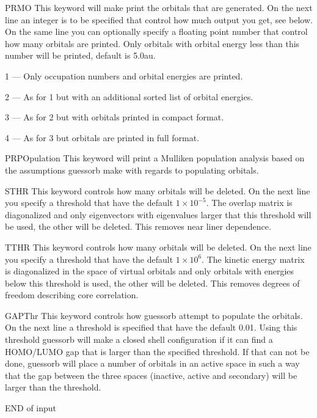 \begin{keywordlist}
\item[PRMO]
This keyword will make  print the orbitals that are
generated. On the next line an integer is to be specified that control
how much output you get, see below. On the same line you can optionally specify
a floating point number that control how many orbitals are printed.
Only orbitals with orbital energy less than this number will be printed,
default is 5.0au.
\begin{list}{}{}
\item 1 --- Only occupation numbers and orbital energies are printed.
\item 2 --- As for 1 but with an additional sorted list of orbital energies.
\item 3 --- As for 2 but with orbitals printed in compact format.
\item 4 --- As for 3 but orbitals are printed in full format.
\end{list}
\item[PRPOpulation]
This keyword will print a Mulliken population analysis based on the
assumptions guessorb make with regards to populating orbitals.
\item[STHR]
This keyword controls how many orbitals will be deleted.
On the next line you specify a threshold that have the default $1\times 10^{-5}$.
The overlap matrix is diagonalized and only eigenvectors
with eigenvalues larger that this threshold will be used,
the other will be deleted.
This removes near liner dependence.
\item[TTHR]
This keyword controls how many orbitals will be deleted.
On the next line you specify a threshold that have the default $1\times 10^6$.
The kinetic energy matrix is diagonalized in the space
of virtual orbitals and only orbitals with energies below
this threshold is used, the other will be deleted.
This removes degrees of freedom describing core correlation.
\item[GAPThr]
This keyword controls how guessorb attempt to populate
the orbitals.
On the next line a threshold is specified that have
the default 0.01.
Using this threshold guessorb will make a closed shell
configuration if it can find a HOMO/LUMO gap that is larger
than the specified threshold.
If that can not be done, guessorb will place a number of orbitals
in an active space in such a way that the gap between the
three spaces (inactive, active and secondary) will be
larger than the threshold.
\item[END of input]
\end{keywordlist}


